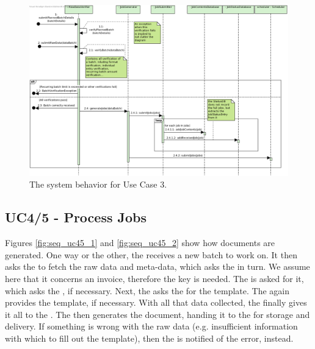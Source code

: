 \begin{figure}[!htp]
    \centering
    \includegraphics[width=\textwidth]{figures/UC3 - Initiate document processing.png}
    \caption{The system behavior for Use Case 3.
        }\label{fig:seq_uc3}
\end{figure}

\subsection{UC4/5 - Process Jobs}
Figures \ref{fig:seq_uc45_1} and \ref{fig:seq_uc45_2} show how documents are generated. One way or the other, the  receives a new batch to work on. It then asks the  to fetch the raw data and meta-data, which asks the  in turn. We assume here that it concerns an invoice, therefore the key is needed. The  is asked for it, which asks the , if necessary. Next, the  asks the  for the template. The  again provides the template, if necessary. With all that data collected, the  finally gives it all to the . The  then generates the document, handing it to the  for storage and delivery. If something is wrong with the raw data (e.g. insufficient information with which to fill out the template), then the  is notified of the error, instead.

